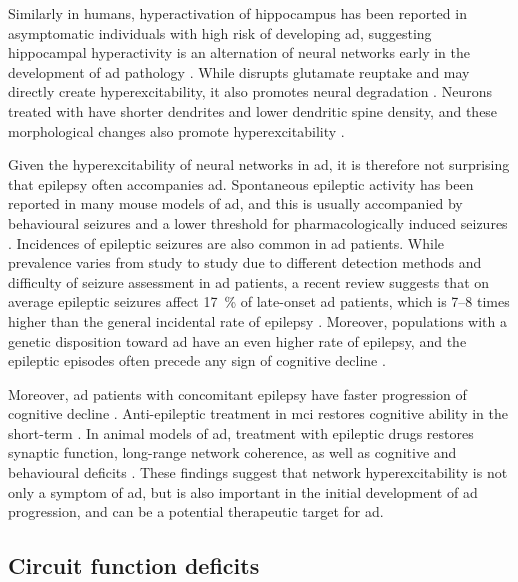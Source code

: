 Similarly in humans, hyperactivation of hippocampus has been reported in asymptomatic individuals with high risk of developing \gls{ad}, suggesting hippocampal hyperactivity is an alternation of neural networks early in the development of \gls{ad} pathology \citep{sperling09, reiman12}. While \abeta{} disrupts glutamate reuptake and may directly create hyperexcitability, it also promotes neural degradation \citep{spires04, koffie09}. Neurons treated with \abeta{} have shorter dendrites and lower dendritic spine density, and these morphological changes also promote hyperexcitability \citep{siskova14}.

Given the hyperexcitability of neural networks in \gls{ad}, it is therefore not surprising that epilepsy often accompanies \gls{ad}. Spontaneous epileptic activity has been reported in many mouse models of \gls{ad}, and this is usually accompanied by behavioural seizures and a lower threshold for pharmacologically induced seizures \citep{palop07, um12, ittner10}. Incidences of epileptic seizures are also common in \gls{ad} patients. While prevalence varies from study to study due to different detection methods and difficulty of seizure assessment in \gls{ad} patients, a recent review suggests that on average epileptic seizures affect \SI{17}{\percent} of late-onset \gls{ad} patients, which is 7--8 times higher than the general incidental rate of epilepsy \citep{amatniek06, horvath16}. Moreover, populations with a genetic disposition toward \gls{ad} have an even higher rate of epilepsy, and the epileptic episodes often precede any sign of cognitive decline \citep{moehlmann02,cabrejo06,mcnaughton12}. 

Moreover, \gls{ad} patients with concomitant epilepsy have faster progression of cognitive decline \citep{vossel13, bakker15}. Anti-epileptic treatment in \gls{mci} restores cognitive ability in the short-term \citep{bakker15}. In animal models of \gls{ad}, treatment with epileptic  drugs restores synaptic function, long-range network coherence, as well as cognitive and behavioural deficits \citep{sanchez12, busche15}. These findings suggest that network hyperexcitability is not only a symptom of \gls{ad}, but is also important in the initial development of \gls{ad} progression, and can be a potential therapeutic target for \gls{ad}.

\subsection{Circuit function deficits}
\begin{comment}
\subsubsection{synchrony}
\citep{goutagny13}
\end{comment}
